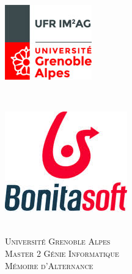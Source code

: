 \documentclass[12pt]{article}
\begin{document}
\graphicspath{{images/}}
\begin{titlepage}

\newcommand{\HRule}{\rule{\linewidth}{0.5mm}} %
\setlength{\topmargin}{0in}
\center %


 \begin{minipage}{0.4\textwidth}
\begin{flushleft} \large
\hspace*{-0.5cm}
\includegraphics[scale=0.4]{images/imag.jpg}\\
\end{flushleft}
\end{minipage}
~
\begin{minipage}{0.5\textwidth}
\begin{flushright} \large
\hspace*{2cm}
\includegraphics[scale=0.4]{images/company.png}\\
\end{flushright}
\end{minipage}\\[1cm]

\textsc{\LARGE Université Grenoble Alpes}\\[1.5cm]
\textsc{\Large Master 2 Génie Informatique}\\[0.5cm]
\textsc{\large Mémoire d'Alternance}\\[0.5cm]



\end{titlepage}
\end{document}
